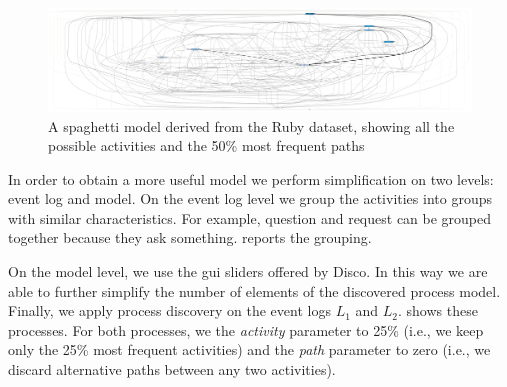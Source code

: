 \begin{figure}
	\centering
	\includegraphics[width=1\linewidth]{figures/not-merged-a100-p50}
	\caption[A spaghetti model derived from the Ruby dataset]{A spaghetti model derived from the Ruby dataset, showing all the possible activities and the 50\% most frequent paths}
	\label{fig:notmerged-a100-p50}
\end{figure}


In order to obtain a more useful model we perform simplification on two levels: event log and model. On the event log level we group the activities into groups with similar characteristics. For example, question and request can be grouped together because they ask something.  reports the grouping. 



On the model level, we use the \gls{gui} sliders offered by Disco. In this way we are able to further simplify the number of elements of the discovered process model. Finally, we apply process discovery on the event logs $L_1$ and $L_2$.  shows these processes. For both processes, we the \emph{activity} parameter to 25\% (i.e., we keep only the 25\% most frequent activities) and the \emph{path} parameter to zero (i.e., we discard alternative paths between any two activities).

